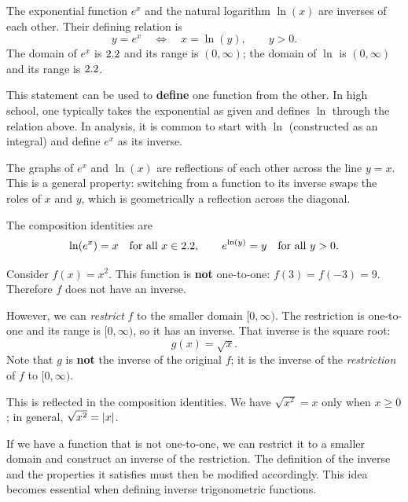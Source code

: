 \begin{example}
\label{ex:4-2}
The exponential function $e^{x}$ and the natural logarithm $\ln(x)$ are inverses of each other.  Their defining relation is
\[
  y = e^{x} \quad \Longleftrightarrow \quad x = \ln(y), \qquad y > 0.
\]
The domain of $e^{x}$ is $2.2$ and its range is $(0,\infty)$; the domain of $\ln$ is $(0,\infty)$ and its range is $2.2$.

This statement can be used to \textbf{define} one function from the other.  In high school, one typically takes the exponential as given and defines $\ln$ through the relation above.  In analysis, it is common to start with $\ln$ (constructed as an integral) and define $e^{x}$ as its inverse.

The graphs of $e^{x}$ and $\ln(x)$ are reflections of each other across the line $y = x$.  This is a general property: switching from a function to its inverse swaps the roles of $x$ and $y$, which is geometrically a reflection across the diagonal.

The composition identities are
\[
  \ln(e^{x}) = x \quad \text{for all } x \in 2.2,
  \qquad
  e^{\ln(y)} = y \quad \text{for all } y > 0.
\]
\end{example}

\begin{example}
\label{ex:4-3}
Consider $f(x) = x^{2}$.  This function is \textbf{not} one-to-one: $f(3) = f(-3) = 9$.  Therefore $f$ does not have an inverse.

However, we can \emph{restrict} $f$ to the smaller domain $[0, \infty)$.  The restriction is one-to-one and its range is $[0, \infty)$, so it has an inverse.  That inverse is the square root:
\[
  g(x) = \sqrt{x}.
\]
Note that $g$ is \textbf{not} the inverse of the original $f$; it is the inverse of the \emph{restriction} of $f$ to $[0, \infty)$.

This is reflected in the composition identities.  We have $\sqrt{x^{2}} = x$ only when $x \geq 0$; in general, $\sqrt{x^{2}} = \left\lvert x \right\rvert$.
\end{example}

\begin{remark}
If we have a function that is not one-to-one, we can restrict it to a smaller domain and construct an inverse of the restriction.  The definition of the inverse and the properties it satisfies must then be modified accordingly.  This idea becomes essential when defining inverse trigonometric functions.
\end{remark}

